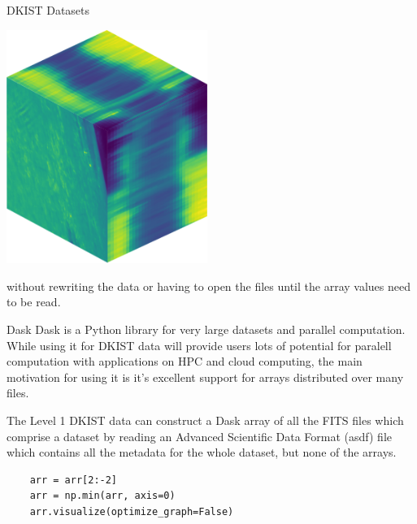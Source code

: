 \documentclass[landscape,a0paper,fontscale=0.32]{baposter}
\begin{document}
\begin{poster}
\begin{posterbox}[name=dataset,column=0,row=0,span=1,below=intro]{DKIST Datasets}
  \begin{center}
    \includegraphics[width=0.49\textwidth]{cube.png}
  \end{center}

  without rewriting the data or having to open the files until the array values
  need to be read.
  
\end{posterbox}

\begin{posterbox}[name=dask,column=1,row=0,span=1,below=intro]{Dask}
  Dask is a Python library for very large datasets and parallel computation.
  While using it for DKIST data will provide users lots of potential for
  paralell computation with applications on HPC and cloud computing, the main
  motivation for using it is it's excellent support for arrays distributed over
  many files.

  The Level 1 DKIST data can construct a Dask array of all the FITS files which
  comprise a dataset by reading an Advanced Scientific Data Format (asdf) file
  which contains all the metadata for the whole dataset, but none of the arrays.
  
  \begin{verbatim}
    arr = arr[2:-2]
    arr = np.min(arr, axis=0)
    arr.visualize(optimize_graph=False)
  \end{verbatim}


\end{posterbox}
\end{poster}
\end{document}
